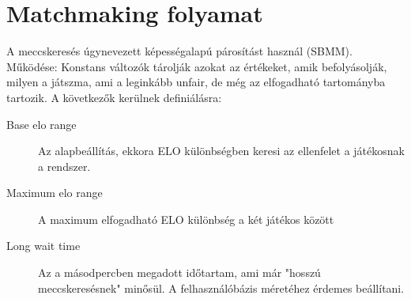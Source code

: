 \section{Matchmaking folyamat}
\label{sec:matchmaking}
A meccskeresés úgynevezett képességalapú párosítást használ (SBMM\footnotemark).
\\
Működése: Konstans változók tárolják azokat az értékeket, amik befolyásolják, milyen a játszma, ami a leginkább unfair, de még az elfogadható tartományba tartozik. A következők kerülnek definiálásra:
\begin{description}
    \item[Base elo range] Az alapbeállítás, ekkora ELO különbségben keresi az ellenfelet a játékosnak a rendszer. 
    \item[Maximum elo range] A maximum elfogadható ELO különbség a két játékos között
    \item[Long wait time] Az a másodpercben megadott időtartam, ami már "hosszú meccskeresésnek" minősül. A felhasználóbázis méretéhez érdemes beállítani.
\end{description}

